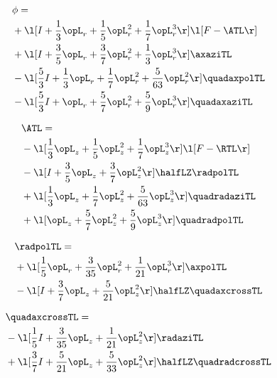 \begin{alignat}{2} 
\label{eq:scalarFlux_0} 
& \phi = \\ 
& + \l[ I + \frac{1}{3} \opL_r + \frac{1}{5} \opL_r^{2} + \frac{1}{7} \opL_r^{3}  \r] \l[ F - \ATL \r] \nonumber \\ 
& + \l[ I + \frac{3}{5} \opL_r + \frac{3}{7} \opL_r^{2} + \frac{1}{3} \opL_r^{3}  \r] \axaziTL \nonumber \\ 
& - \l[ \frac{5}{3} I + \frac{1}{3} \opL_r + \frac{1}{7} \opL_r^{2} + \frac{5}{63} \opL_r^{2}  \r] \quadaxpolTL \nonumber \\ 
& - \l[ \frac{5}{3} I + \opL_r + \frac{5}{7} \opL_r^{2} + \frac{5}{9} \opL_r^{3}  \r] \quadaxaziTL \nonumber \\ 
\end{alignat} 


\begin{alignat}{2} 
\label{eq:isoATL_0} 
& \ATL = \\ 
& - \l[ \frac{1}{3} \opL_z + \frac{1}{5} \opL_z^{2} + \frac{1}{7} \opL_z^{3}  \r] \l[ F - \RTL \r] \nonumber \\ 
& - \l[ I + \frac{3}{5} \opL_z + \frac{3}{7} \opL_z^{2}  \r] \halfLZ \radpolTL \nonumber \\ 
& + \l[ \frac{1}{3} \opL_z + \frac{1}{7} \opL_z^{2} + \frac{5}{63} \opL_z^{3}  \r] \quadradaziTL \nonumber \\ 
& + \l[ \opL_z + \frac{5}{7} \opL_z^{2} + \frac{5}{9} \opL_z^{3}  \r] \quadradpolTL \nonumber \\ 
\end{alignat} 


\begin{alignat}{2} 
\label{eq:linradpolTL_0} 
& \radpolTL = \\ 
& + \l[ \frac{1}{5} \opL_r + \frac{3}{35} \opL_r^{2} + \frac{1}{21} \opL_r^{3}  \r] \axpolTL \nonumber \\ 
& - \l[ I + \frac{3}{7} \opL_z + \frac{5}{21} \opL_z^{2}  \r] \halfLZ \quadaxcrossTL \nonumber \\ 
\end{alignat} 


\begin{alignat}{2} 
\label{eq:quadaxcrossTL_0} 
& \quadaxcrossTL = \\ 
& - \l[ \frac{1}{5} I + \frac{3}{35} \opL_z + \frac{1}{21} \opL_z^{2}  \r] \radaziTL \nonumber \\ 
& + \l[ \frac{3}{7} I + \frac{5}{21} \opL_z + \frac{5}{33} \opL_z^{2}  \r] \halfLZ \quadradcrossTL \nonumber \\ 
\end{alignat} 


